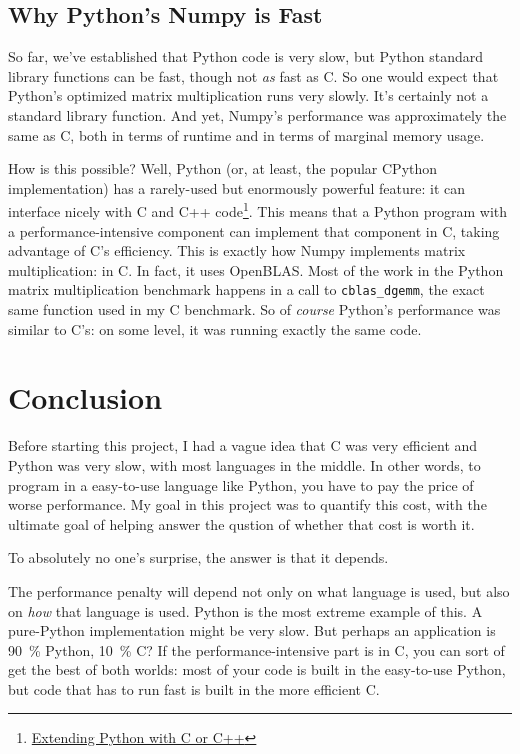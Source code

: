 \documentclass[12pt,letterpaper]{article}
\begin{document}
\subsection{Why Python's Numpy is Fast}

So far, we've established that Python code is very slow, but Python standard
library functions can be fast, though not \emph{as} fast as C. So one would
expect that Python's optimized matrix multiplication runs very slowly. It's
certainly not a standard library function. And yet, Numpy's performance was
approximately the same as C, both in terms of runtime and in terms of marginal
memory usage.

How is this possible? Well, Python (or, at least, the popular CPython
implementation) has a rarely-used but enormously powerful feature: it can
interface nicely with C and C++
code\footnote{\href{https://docs.python.org/3/extending/extending.html}{Extending
Python with C or C++}}. This means that a Python program with a
performance-intensive component can implement that component in C, taking
advantage of C's efficiency. This is exactly how Numpy implements matrix
multiplication: in C. In fact, it uses OpenBLAS. Most of the work in the Python
matrix multiplication benchmark happens in a call to \texttt{cblas\_dgemm}, the
exact same function used in my C benchmark. So of \emph{course} Python's
performance was similar to C's: on some level, it was running exactly the same
code.

\section{Conclusion}\label{conclusion}

Before starting this project, I had a vague idea that C was very efficient and
Python was very slow, with most languages in the middle. In other words, to
program in a easy-to-use language like Python, you have to pay the price of
worse performance. My goal in this project was to quantify this cost, with the
ultimate goal of helping answer the qustion of whether that cost is worth it.

To absolutely no one's surprise, the answer is that it depends.

The performance penalty will depend not only on what language is used, but also
on \emph{how} that language is used. Python is the most extreme example of
this. A pure-Python implementation might be very slow. But perhaps an
application is \SI{90}{\%} Python, \SI{10}{\%} C? If the performance-intensive
part is in C, you can sort of get the best of both worlds: most of your code is
built in the easy-to-use Python, but code that has to run fast is built in the
more efficient C.
\end{document}
